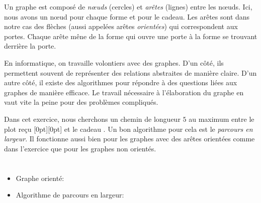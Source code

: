 {{Un graphe est composé de \emph{nœuds} (cercles) et \emph{arêtes} (lignes) entre les nœuds. Ici, nous avons un nœud pour chaque forme et pour le cadeau. Les arêtes sont dans notre cas des flèches (aussi appelées arêtes \emph{orientées}) qui correspondent aux portes. Chaque arête mêne de la forme qui ouvre une porte à la forme se trouvant derrière la porte.

En informatique, on travaille volontiers avec des graphes. D’un côté, ils permettent souvent de représenter des relations abstraites de manière claire. D’un autre côté, il existe des algorithmes pour répondre à des questions liées aux graphes de manière efficace. Le travail nécessaire à l’élaboration du graphe en vaut vite la peine pour des problèmes compliqués.

Dans cet exercice, nous cherchons un chemin de longueur $5$ au maximum entre le plot reçu \raisebox{\dimexpr -0.5ex +0.3ex \relax}[0pt][0pt]{} et le cadeau \raisebox{\dimexpr -0.5ex +0.3ex \relax}{}. Un bon algorithme pour cela est le \emph{parcours en largeur}. Il fonctionne aussi bien pour les graphes avec des arêtes orientées comme dans l’exercice que pour les graphes non orientés.



\section*{\BrochureWebsitesAndKeywords}
{\raggedright
\begin{itemize}
  \item Graphe orienté: \href{https://fr.wikipedia.org/wiki/Graphe_orient\%C3\%A9}{}
  \item Algorithme de parcours en largeur: \href{https://fr.wikipedia.org/wiki/Algorithme_de_parcours_en_largeur}{}
\end{itemize}


}

}{}

\def\AuthorBergsveinsdottirL{} %
\def\AuthorFreiF{} %
\def\AuthorPohlW{} %
\def\AuthorDatzkoS{} %
\def\AuthorPelletE{} %

\newpage}{}
